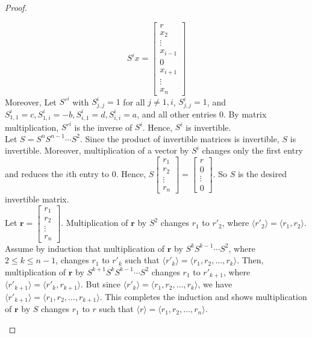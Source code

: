 \documentclass[12pt]{article}
\begin{document}
\begin{proof}
\begin{enumerate}
    $$S^ix = \begin{bmatrix} r\\ x_2 \\ \vdots \\ x_{i-1} \\ 0 \\ x_{i+1} \\ \vdots \\ x_n \end{bmatrix}$$ 
    Moreover, Let $S'^i$ with $S^i_{j, j} = 1$ for all $j \neq 1, i$, $S^i_{j, j} = 1$, and $S^i_{1,1} = c, S^i_{1,i} = -b, S^i_{i,1} = d, S^i_{i,i} = a$, and all other entries $0$. By matrix multiplication, $S'^i$ is the inverse of $S^i$. Hence, $S^i$ is invertible. \\

    Let $S = S^{n}S^{n-1}\cdots S^2$. Since the product of invertible matrices is invertible, $S$ is invertible. Moreover, multiplication of a vector by $S^i$ changes only the first entry and reduces the $i$th entry to $0$. Hence, $S\begin{bmatrix} r_1\\ r_2 \\ \vdots \\ r_n \end{bmatrix} = \begin{bmatrix} r\\ 0 \\ \vdots \\ 0 \end{bmatrix}$. So $S$ is the desired invertible matrix. \\

    Let $\textbf{r} = \begin{bmatrix} r_1\\ r_2 \\ \vdots \\ r_n \end{bmatrix}$. Multiplication of $\textbf{r}$ by $S^2$ changes $r_1$ to $r'_2$, where $\langle r'_2 \rangle = \langle r_1, r_2 \rangle$. Assume by induction that multiplication of $\textbf{r}$ by $S^kS^{k-1}\cdots S^2$, where $2\leq k \leq n-1$, changes $r_1$ to $r'_k$ such that $\langle r'_k \rangle = \langle r_1, r_2, \ldots, r_k \rangle$. Then, multiplication of $\textbf{r}$ by $S^{k+1}S^kS^{k-1}\cdots S^2$ changes $r_1$ to $r'_{k+1}$, where $\langle r'_{k+1} \rangle = \langle r'_k, r_{k+1} \rangle$. But since $\langle r'_k \rangle = \langle r_1, r_2, \ldots, r_k \rangle$, we have $\langle r'_{k+1} \rangle = \langle r_1, r_2, \ldots, r_{k+1} \rangle$. This completes the induction and shows multiplication of $\textbf{r}$ by $S$ changes $r_1$ to $r$ such that $\langle r \rangle = \langle r_1, r_2, \ldots, r_n \rangle$.


\end{enumerate}
\end{proof}
\end{document}
